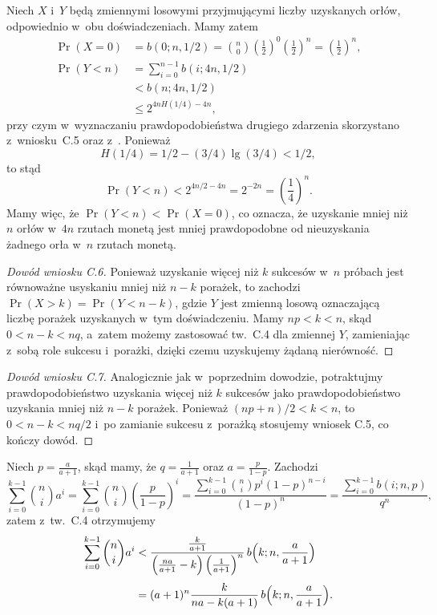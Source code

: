 
\exercise{} %
Niech $X$ i~$Y$ będą zmiennymi losowymi przyjmującymi liczby uzyskanych orłów, odpowiednio w~obu doświadczeniach. Mamy zatem
\begin{align*}
	\Pr(X=0) &= b(0;n,1/2) = \binom{n}{0}\left(\frac{1}{2}\right)^0\left(\frac{1}{2}\right)^n = \left(\frac{1}{2}\right)^n, \\
	\Pr(Y<n) &= \sum_{i=0}^{n-1}b(i;4n,1/2) \\[1mm]
	&< b(n;4n,1/2) \\[1mm]
	&\le 2^{4nH(1/4)-4n},
\end{align*}
przy czym w~wyznaczaniu prawdopodobieństwa drugiego zdarzenia skorzystano z~wniosku~C.5 oraz z~. Ponieważ
\[
	H(1/4) = 1/2-(3/4)\lg(3/4) < 1/2,
\]
to stąd
\[
	\Pr(Y<n) < 2^{4n/2-4n} = 2^{-2n} = \left(\frac{1}{4}\right)^n.
\]
Mamy więc, że $\Pr(Y<n)<\Pr(X=0)$, co oznacza, że uzyskanie mniej niż $n$ orłów w~$4n$ rzutach monetą jest mniej prawdopodobne od nieuzyskania żadnego orła w~$n$ rzutach monetą.

\exercise{} %
\begin{proof}[Dowód wniosku C.6]
	Ponieważ uzyskanie więcej niż $k$ sukcesów w~$n$ próbach jest równoważne usyskaniu mniej niż $n-k$ porażek, to zachodzi $\Pr(X>k)=\Pr(Y<n-k)$, gdzie $Y$ jest zmienną losową oznaczającą liczbę porażek uzyskanych w~tym doświadczeniu. Mamy $np<k<n$, skąd $0<n-k<nq$, a~zatem możemy zastosować tw.~C.4 dla zmiennej $Y$, zamieniając z~sobą role sukcesu i~porażki, dzięki czemu uzyskujemy żądaną nierówność.
\end{proof}

\begin{proof}[Dowód wniosku C.7]
	Analogicznie jak w~poprzednim dowodzie, potraktujmy prawdopodobieństwo uzyskania więcej niż $k$ sukcesów jako prawdopodobieństwo uzyskania mniej niż $n-k$ porażek. Ponieważ $(np+n)/2<k<n$, to $0<n-k<nq/2$ i~po zamianie sukcesu z~porażką stosujemy wniosek C.5, co kończy dowód.
\end{proof}

\exercise{} %

\noindent Niech $p=\frac{a}{a+1}$, skąd mamy, że $q=\frac{1}{a+1}$ oraz $a=\frac{p}{1-p}$. Zachodzi
\[
	\sum_{i=0}^{k-1}\binom{n}{i}a^i = \sum_{i=0}^{k-1}\binom{n}{i}\left(\frac{p}{1-p}\right)^i = \frac{\sum_{i=0}^{k-1}\binom{n}{i}p^i(1-p)^{n-i}}{(1-p)^n} = \frac{\sum_{i=0}^{k-1}b(i;n,p)}{q^n},
\]
zatem z~tw.~C.4 otrzymujemy
\begin{align*}
	\sum_{i=0}^{k-1}\binom{n}{i}a^i &< \frac{\frac{k}{a+1}}{\left(\frac{na}{a+1}-k\right)\left(\frac{1}{a+1}\right)^n}\,b\Bigl(k;n,\frac{a}{a+1}\Bigr) \\[1mm]
	&= (a+1)^n\frac{k}{na-k(a+1)}\,b\Bigl(k;n,\frac{a}{a+1}\Bigr).
\end{align*}

